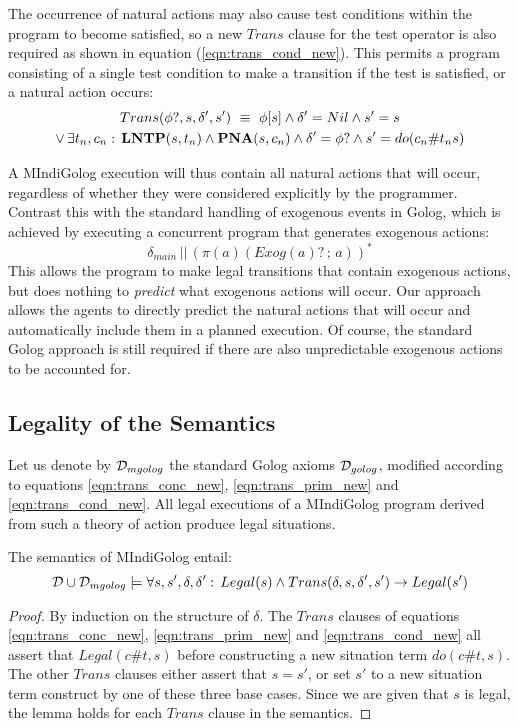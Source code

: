 \newpage{}The occurrence of natural actions may also cause test conditions
within the program to become satisfied, so a new $Trans$ clause for
the test operator is also required as shown in equation (\ref{eqn:trans_cond_new}).
This permits a program consisting of a single test condition to make
a transition if the test is satisfied, or a natural action occurs:
\begin{multline}
Trans(\phi?,s,\delta',s')\,\,\equiv\,\,\phi[s]\wedge\delta'=Nil\wedge s'=s\\
\vee\,\exists t_{n},c_{n}:\,\mathbf{LNTP}(s,t_{n})\wedge\mathbf{PNA}(s,c_{n})\wedge\delta'=\phi?\wedge s'=do(c_{n}\#t_{n}s)\label{eqn:trans_cond_new}\end{multline}


A MIndiGolog execution will thus contain all natural actions that
will occur, regardless of whether they were considered explicitly
by the programmer. Contrast this with the standard handling of exogenous
events in Golog, which is achieved by executing a concurrent program
that generates exogenous actions:\[
\delta_{main}\,||\,\left(\pi(a)(Exog(a)?\,;\, a)\right)^{*}\]
 This allows the program to make legal transitions that contain exogenous
actions, but does nothing to \emph{predict} what exogenous actions
will occur. Our approach allows the agents to directly predict the
natural actions that will occur and automatically include them in
a planned execution. Of course, the standard Golog approach is still
required if there are also unpredictable exogenous actions to be accounted
for.


\subsection{Legality of the Semantics}

Let us denote by $\mathcal{D}_{mgolog}$ the standard Golog axioms $\mathcal{D}_{golog}$,
modified according to equations \eqref{eqn:trans_conc_new}, \eqref{eqn:trans_prim_new}
and \eqref{eqn:trans_cond_new}. All legal executions of a MIndiGolog
program derived from such a theory of action produce legal situations.

\begin{lemma}
The semantics of MIndiGolog entail:\label{lem:MIndiGolog:trans_legal}\[
\mathcal{D}\cup\mathcal{D}_{mgolog}\models\forall s,s',\delta,\delta':\, Legal(s)\wedge Trans(\delta,s,\delta',s')\rightarrow Legal(s')\]

\end{lemma}
\begin{proof}
By induction on the structure of $\delta$. The $Trans$ clauses of
equations \eqref{eqn:trans_conc_new}, \eqref{eqn:trans_prim_new}
and \eqref{eqn:trans_cond_new} all assert that $Legal(c\#t,s)$ before
constructing a new situation term $do(c\#t,s)$. The other $Trans$
clauses either assert that $s=s'$, or set $s'$ to a new situation
term construct by one of these three base cases. Since we are given
that $s$ is legal, the lemma holds for each $Trans$ clause in the
semantics. 
\end{proof}
\newpage{}

